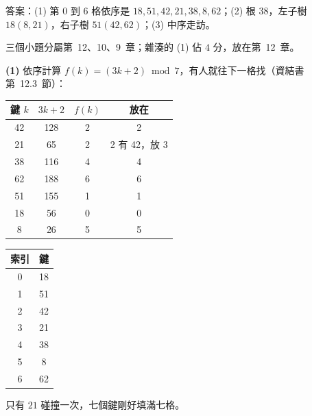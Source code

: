 \begin{pastsoln}
答案：(1) 第 $0$ 到 $6$ 格依序是 $18, 51, 42, 21, 38, 8, 62$；(2) 根 $38$，左子樹 $18(8, 21)$，右子樹
$51(42, 62)$；(3) 中序走訪。

三個小題分屬第~12、10、9~章；雜湊的 (1) 佔 $4$ 分，放在第~12~章。

\textbf{(1)} 依序計算 $f(k) = (3k + 2) \bmod 7$，有人就往下一格找（資結書第~12.3~節）：
\begin{center}
\small
\begin{tabular}{cccc}
\toprule
鍵 $k$ & $3k + 2$ & $f(k)$ & 放在 \\
\midrule
42 & 128 & 2 & 2 \\
21 & 65 & 2 & 2 有 42，放 3 \\
38 & 116 & 4 & 4 \\
62 & 188 & 6 & 6 \\
51 & 155 & 1 & 1 \\
18 & 56 & 0 & 0 \\
8 & 26 & 5 & 5 \\
\bottomrule
\end{tabular}
\qquad
\begin{tabular}{|c|c|}
\hline
索引 & 鍵 \\ \hline
0 & 18 \\ \hline
1 & 51 \\ \hline
2 & 42 \\ \hline
3 & 21 \\ \hline
4 & 38 \\ \hline
5 & 8 \\ \hline
6 & 62 \\ \hline
\end{tabular}
\end{center}
只有 $21$ 碰撞一次，七個鍵剛好填滿七格。


\end{pastsoln}
